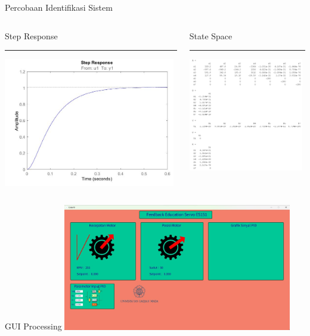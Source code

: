 \documentclass[10pt,xcolor={dvipsnames}]{beamer}
\begin{document}
\begin{frame}{Percobaan Identifikasi Sistem}
	\begin{columns}[T] %
		\begin{column}{0.48\textwidth}
			Step Response
			\color{black}\rule{\linewidth}{4pt}
			\includegraphics[width=7.5cm]{Coba Sistem Identification/tf1.jpg}
		\end{column}%
		\hfill%
		\begin{column}{0.48\textwidth}
			State Space
			\color{blue}\rule{\linewidth}{4pt}
			\begin{center}
				\includegraphics[width=5cm]{Coba Sistem Identification/ss1.png}
			\end{center}
		\end{column}
	\end{columns}
\end{frame}

\begin{frame}{GUI Processing}
	\centering
	\includegraphics[width=10cm]{Gambar Lain/guiprocessing.jpeg}
\end{frame}
\end{document}

